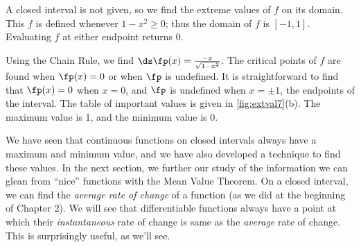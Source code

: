 {A closed interval is not given, so we find the extreme values of $f$ on its domain. This $f$ is defined whenever $1-x^2\geq 0$; thus the domain of $f$ is $[-1,1]$. Evaluating $f$ at either endpoint returns 0.

Using the Chain Rule, we find $\ds \fp(x) = \frac{-x}{\sqrt{1-x^2}}$. The critical points of $f$ are found when $\fp(x) = 0$ or when $\fp$ is undefined. It is straightforward to find that $\fp(x) = 0$ when $x=0$, and $\fp$ is undefined when $x=\pm 1$, the endpoints of the interval. The table of important values is given in \autoref{fig:extval7}(b). The maximum value is 1, and the minimum value is 0.}


We have seen that continuous functions on closed intervals always have a maximum and minimum value, and we have also developed a technique to find these values. In the next section, we further our study of the information we can glean from ``nice'' functions with the Mean Value Theorem. On a closed interval, we can find the \textit{average rate of change} of a function (as we did at the beginning of Chapter 2). We will see that differentiable functions always have a point at which their \textit{instantaneous} rate of change is same as the \textit{average} rate of change. This is surprisingly useful, as we'll see.

